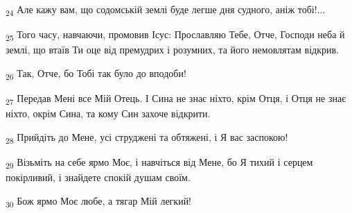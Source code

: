 \begin{tcolorbox}
\textsubscript{24} Але кажу вам, що содомській землі буде легше дня судного, аніж тобі!...
\end{tcolorbox}
\begin{tcolorbox}
\textsubscript{25} Того часу, навчаючи, промовив Ісус: Прославляю Тебе, Отче, Господи неба й землі, що втаїв Ти оце від премудрих і розумних, та його немовлятам відкрив.
\end{tcolorbox}
\begin{tcolorbox}
\textsubscript{26} Так, Отче, бо Тобі так було до вподоби!
\end{tcolorbox}
\begin{tcolorbox}
\textsubscript{27} Передав Мені все Мій Отець. І Сина не знає ніхто, крім Отця, і Отця не знає ніхто, окрім Сина, та кому Син захоче відкрити.
\end{tcolorbox}
\begin{tcolorbox}
\textsubscript{28} Прийдіть до Мене, усі струджені та обтяжені, і Я вас заспокою!
\end{tcolorbox}
\begin{tcolorbox}
\textsubscript{29} Візьміть на себе ярмо Моє, і навчіться від Мене, бо Я тихий і серцем покірливий, і знайдете спокій душам своїм.
\end{tcolorbox}
\begin{tcolorbox}
\textsubscript{30} Бож ярмо Моє любе, а тягар Мій легкий!
\end{tcolorbox}
